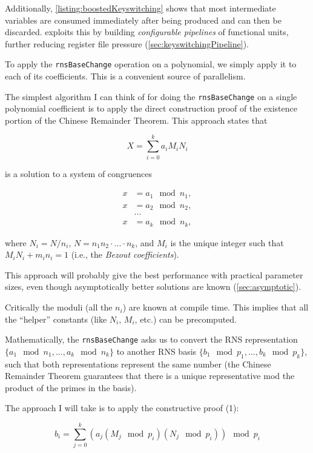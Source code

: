 Additionally, \autoref{listing:boostedKeyswitching} shows that most intermediate
variables are consumed immediately after being produced and can then be discarded.
\name exploits this by building \emph{configurable pipelines} of functional units,
further reducing register file pressure (\autoref{sec:keyswitchingPipeline}).

To apply the \verb!rnsBaseChange! operation on a polynomial, we simply apply it to
each of its coefficients. This is a convenient source of parallelism.

The simplest algorithm I can think of for doing the \verb!rnsBaseChange! on a
single polynomial coefficient is to apply the direct construction proof of the
existence portion of the Chinese Remainder Theorem\cite{gauss1966english}.
This approach states that

\begin{equation*}
X = \sum_{i=0}^k a_i M_i N_i
\end{equation*}

is a solution to a system of congruences

\begin{align*}
    x &= a_1 \mod n_1, \\
    x &= a_2 \mod n_2, \\
      &... \\
    x &= a_k \mod n_k,
\end{align*}

where $N_i = N/n_i$, $N=n_1n_2\cdot...\cdot n_k$, and $M_i$ is the unique integer
such that $M_iN_i + m_in_i = 1$ (i.e., the \emph{Bezout coefficients}).

This approach will probably give the best performance with practical parameter
sizes, even though asymptotically better solutions are known (\autoref{sec:asymptotic}).

Critically the moduli (all the $n_i$) are known at compile time. This implies
that all the “helper” constants (like $N_i$, $M_i$, etc.) can be precomputed.

Mathematically, the \verb!rnsBaseChange! asks us to convert the RNS representation
$\{a_1 \mod n_1, …, a_k \mod n_k\}$ to another RNS basis $\{b_1 \mod p_1, …, b_k
\mod p_k\}$, such that both representations represent the same number (the
Chinese Remainder Theorem guarantees that there is a unique representative mod
the product of the primes in the basis).

The approach I will take is to apply the constructive proof (1):

\begin{equation*}
b_i = \sum_{j=0}^k (a_j (M_j \mod p_i) (N_j \mod p_i)) \mod p_i
\end{equation*}

